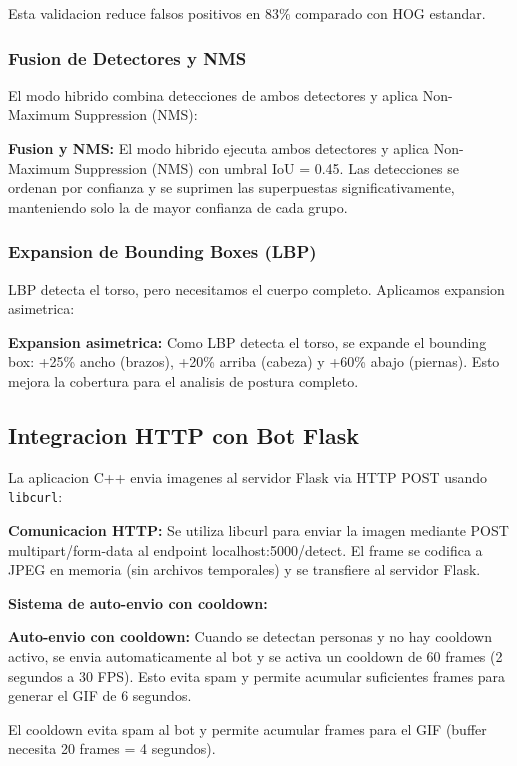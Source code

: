 \documentclass[conference]{IEEEtran}
\begin{document}
Esta validacion reduce falsos positivos en 83\% comparado con HOG estandar.

\subsubsection{Fusion de Detectores y NMS}

El modo hibrido combina detecciones de ambos detectores y aplica Non-Maximum Suppression (NMS):

\textbf{Fusion y NMS:} El modo hibrido ejecuta ambos detectores y aplica Non-Maximum Suppression (NMS) con umbral IoU = 0.45. Las detecciones se ordenan por confianza y se suprimen las superpuestas significativamente, manteniendo solo la de mayor confianza de cada grupo.

\subsubsection{Expansion de Bounding Boxes (LBP)}

LBP detecta el torso, pero necesitamos el cuerpo completo. Aplicamos expansion asimetrica:

\textbf{Expansion asimetrica:} Como LBP detecta el torso, se expande el bounding box: +25\% ancho (brazos), +20\% arriba (cabeza) y +60\% abajo (piernas). Esto mejora la cobertura para el analisis de postura completo.

\subsection{Integracion HTTP con Bot Flask}

La aplicacion C++ envia imagenes al servidor Flask via HTTP POST usando \texttt{libcurl}:

\textbf{Comunicacion HTTP:} Se utiliza libcurl para enviar la imagen mediante POST multipart/form-data al endpoint localhost:5000/detect. El frame se codifica a JPEG en memoria (sin archivos temporales) y se transfiere al servidor Flask.

\textbf{Sistema de auto-envio con cooldown:}

\textbf{Auto-envio con cooldown:} Cuando se detectan personas y no hay cooldown activo, se envia automaticamente al bot y se activa un cooldown de 60 frames (2 segundos a 30 FPS). Esto evita spam y permite acumular suficientes frames para generar el GIF de 6 segundos.

El cooldown evita spam al bot y permite acumular frames para el GIF (buffer necesita 20 frames = 4 segundos).
\end{document}
